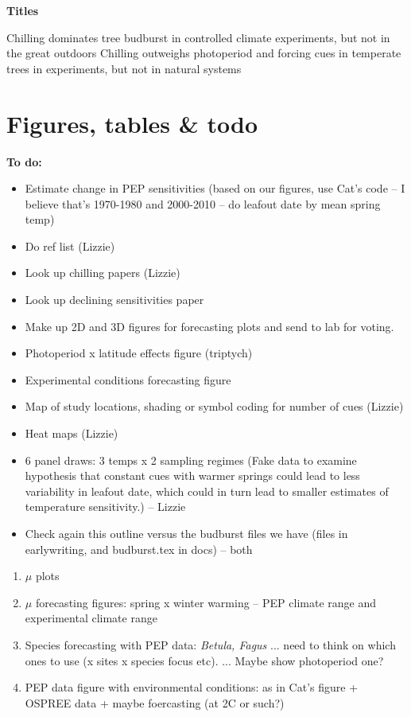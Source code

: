 \documentclass[11pt,letter]{article}
\begin{document}

\renewcommand{\refname}{\CHead{}}


{\bf Titles}

Chilling dominates tree budburst in controlled climate experiments, but not in the great outdoors
Chilling outweighs photoperiod and forcing cues in temperate trees in experiments, but not in natural systems



\section{Figures, tables \& todo}

{\bf To do:}
\begin{itemize}
\item Estimate change in PEP sensitivities (based on our figures, use Cat's code -- I believe that's 1970-1980 and 2000-2010 -- do leafout date by mean spring temp)
\item Do ref list (Lizzie) 
\item Look up chilling papers (Lizzie)
\item Look up declining sensitivities paper 
\item Make up 2D and 3D figures for forecasting plots and send to lab for voting.
\item Photoperiod x latitude effects figure (triptych) 
\item Experimental conditions forecasting figure 
\item Map of study locations, shading or symbol coding for number of cues (Lizzie)
\item Heat maps (Lizzie)
\item 6 panel draws: 3 temps x 2 sampling regimes (Fake data to examine hypothesis that constant cues with warmer springs could lead to less variability in leafout date, which could in turn lead to smaller estimates of temperature sensitivity.) -- Lizzie
\item Check again this outline versus the budburst files we have (files in earlywriting, and budburst.tex in docs) -- both
\end{itemize}


\begin{enumerate}
\item $\mu$ plots
\item  $\mu$ forecasting figures: spring x winter warming -- PEP climate range and experimental climate range
\item Species forecasting with PEP data: \emph{Betula, Fagus} ... need to think on which ones to use (x sites x species focus etc). ... Maybe show photoperiod one?
\item PEP data figure with environmental conditions: as in Cat's figure + OSPREE data + maybe foercasting (at 2C or such?)
\end{enumerate}
\end{document}
